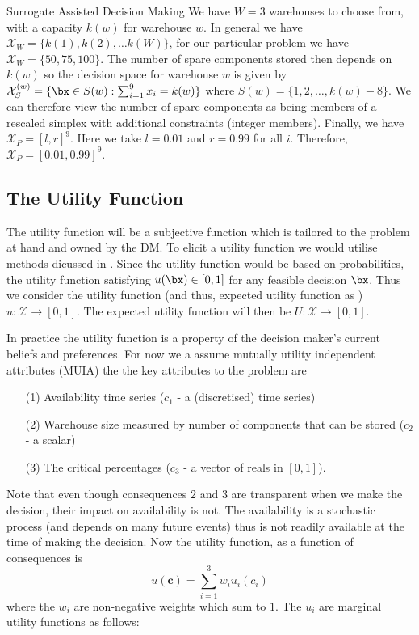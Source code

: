 \begin{chapter}{Surrogate Assisted Decision Making \label{Chap:optimisation}}
We have $W=3$ warehouses to choose from, with a capacity $k(w)$ for warehouse $w$. In general we have $\mathcal{X}_W = \{ k(1), k(2), \ldots k(W)\}$, for our particular problem we have $\mathcal{X}_W = \{50, 75, 100\}$. The number of spare components stored then depends on $k(w)$ so the decision space for warehouse $w$ is given by $\mathcal{X}_{S}^{(w)} = \{ \bx \in S(w) : \sum_{i=1}^9 x_i = k(w)  \}$  where $S(w) = \{ 1, 2, \ldots, k(w) - 8 \}$. We can therefore view the number of spare components as being members of a rescaled simplex with additional constraints (integer members). Finally, we have $\mathcal{X}_P = [l, r]^9$. Here we take $l = 0.01$ and $r = 0.99$ for all $i$. Therefore, $\mathcal{X}_P = [0.01,0.99]^9$.

\subsection{The Utility Function}

The utility function will be a subjective function which is tailored to the problem at hand and owned by the DM. To elicit a utility function we would utilise methods dicussed in . Since the utility function would be based on probabilities, the utility function satisfying $u(\bx) \in [0,1]$ for any feasible decision $\bx$. Thus we consider the utility function (and thus, expected utility function as ) $u: \mathcal{X} \to [0,1]$. The expected utility function will then be $U: \mathcal{X} \to [0,1]$.

In practice the utility function is a property of the decision maker's current beliefs and preferences. For now we a assume mutually utility independent attributes (MUIA) the the key attributes to the problem are
\begin{itemize}
  \item[(1)] Availability time series ($c_1$ - a (discretised) time series)
  \item[(2)] Warehouse size measured by number of components that can be stored ($c_2$ - a scalar)
  \item[(3)] The critical percentages ($c_3$ - a vector of reals in $[0,1]$).
\end{itemize}
Note that even though consequences $2$ and $3$ are transparent when we make the decision, their impact on availability is not. The availability is a stochastic process (and depends on many future events) thus is not readily available at the time of making the decision. Now the utility function, as a function of consequences is
\begin{equation}
  u(\bm{c}) = \sum_{i=1}^3 w_i u_i (c_i)
\end{equation}
where the $w_i$ are non-negative weights which sum to $1$. The $u_i$ are marginal utility functions as follows:


\end{chapter}
